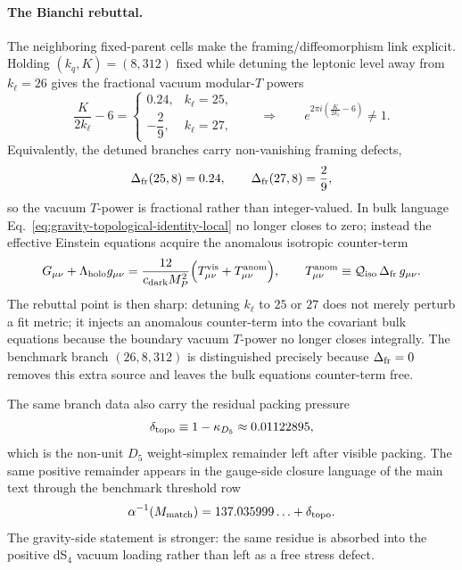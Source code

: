 \documentclass[11pt]{article}
\begin{document}
\paragraph{The Bianchi rebuttal.}
The neighboring fixed-parent cells make the framing/diffeomorphism link explicit. Holding $(k_q,K)=(8,312)$ fixed while detuning the leptonic level away from $k_{\ell}=26$ gives the fractional vacuum modular-$T$ powers
\begin{equation}
\label{eq:gravity-detuned-vacuum-T}
 \frac{K}{2k_{\ell}}-6
 =
 \begin{cases}
 0.24, & k_{\ell}=25,\\[2pt]
 -\dfrac{2}{9}, & k_{\ell}=27,
 \end{cases}
 \qquad\Longrightarrow\qquad
 e^{2\pi i\left(\frac{K}{2k_{\ell}}-6\right)}\neq 1.
\end{equation}
Equivalently, the detuned branches carry non-vanishing framing defects,
\begin{equation}
\label{eq:gravity-detuned-framing-defect}
 \Delta_{\rm fr}(25,8)=0.24,
 \qquad
 \Delta_{\rm fr}(27,8)=\frac{2}{9},
\end{equation}
so the vacuum $T$-power is fractional rather than integer-valued. In bulk language Eq.~\eqref{eq:gravity-topological-identity-local} no longer closes to zero; instead the effective Einstein equations acquire the anomalous isotropic counter-term
\begin{equation}
\label{eq:gravity-detuned-einstein}
 G_{\mu\nu}+\Lambda_{\rm holo}g_{\mu\nu}
 =
 \frac{12}{c_{\rm dark}M_P^2}\Bigl(T^{\rm vis}_{\mu\nu}+T^{\rm anom}_{\mu\nu}\Bigr),
 \qquad
 T^{\rm anom}_{\mu\nu}
 \equiv
 \mathcal Q_{\rm iso}\,\Delta_{\rm fr}\,g_{\mu\nu}.
\end{equation}
The rebuttal point is then sharp: detuning $k_{\ell}$ to $25$ or $27$ does not merely perturb a fit metric; it injects an anomalous counter-term into the covariant bulk equations because the boundary vacuum $T$-power no longer closes integrally. The benchmark branch $(26,8,312)$ is distinguished precisely because $\Delta_{\rm fr}=0$ removes this extra source and leaves the bulk equations counter-term free.

The same branch data also carry the residual packing pressure
\begin{equation}
\label{eq:gravity-delta-topo}
 \delta_{\rm topo}
 \equiv
 1-\kappa_{D_5}
 \approx
 0.01122895,
\end{equation}
which is the non-unit $D_5$ weight-simplex remainder left after visible packing. The same positive remainder appears in the gauge-side closure language of the main text through the benchmark threshold row
\begin{equation}
\label{eq:gravity-alpha-closure}
 \alpha^{-1}(M_{\rm match})
 =
 137.035999\ldots+\delta_{\rm topo}.
\end{equation}
The gravity-side statement is stronger: the same residue is absorbed into the positive dS$_4$ vacuum loading rather than left as a free stress defect.
\end{document}
